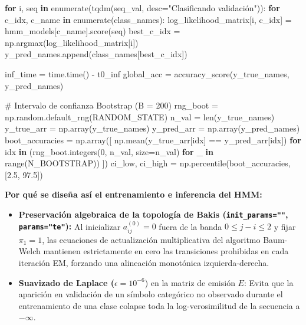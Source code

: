 \documentclass[
  spanish,
  us-letterpaper,
]{scrreprt}
\newenvironment{Shaded}{\begin{snugshade}}{\end{snugshade}}
\newcommand{\BuiltInTok}[1]{\textcolor[rgb]{0.00,0.23,0.31}{#1}}
\newcommand{\CommentTok}[1]{\textcolor[rgb]{0.37,0.37,0.37}{#1}}
\newcommand{\ControlFlowTok}[1]{\textcolor[rgb]{0.00,0.23,0.31}{\textbf{#1}}}
\newcommand{\DecValTok}[1]{\textcolor[rgb]{0.68,0.00,0.00}{#1}}
\newcommand{\FloatTok}[1]{\textcolor[rgb]{0.68,0.00,0.00}{#1}}
\newcommand{\KeywordTok}[1]{\textcolor[rgb]{0.00,0.23,0.31}{\textbf{#1}}}
\newcommand{\NormalTok}[1]{\textcolor[rgb]{0.00,0.23,0.31}{#1}}
\newcommand{\OperatorTok}[1]{\textcolor[rgb]{0.37,0.37,0.37}{#1}}
\newcommand{\StringTok}[1]{\textcolor[rgb]{0.13,0.47,0.30}{#1}}
\providecommand{\tightlist}{%
  \setlength{\itemsep}{0pt}\setlength{\parskip}{0pt}}
\theoremstyle{definition}
\theoremstyle{remark}
\begin{document}
\begin{Shaded}
\begin{Highlighting}[]
\ControlFlowTok{for}\NormalTok{ i, seq }\KeywordTok{in} \BuiltInTok{enumerate}\NormalTok{(tqdm(seq\_val, desc}\OperatorTok{=}\StringTok{"Clasificando validación"}\NormalTok{)):}
    \ControlFlowTok{for}\NormalTok{ c\_idx, c\_name }\KeywordTok{in} \BuiltInTok{enumerate}\NormalTok{(class\_names):}
\NormalTok{        log\_likelihood\_matrix[i, c\_idx] }\OperatorTok{=}\NormalTok{ hmm\_models[c\_name].score(seq)}
\NormalTok{    best\_c\_idx }\OperatorTok{=}\NormalTok{ np.argmax(log\_likelihood\_matrix[i])}
\NormalTok{    y\_pred\_names.append(class\_names[best\_c\_idx])}

\NormalTok{inf\_time }\OperatorTok{=}\NormalTok{ time.time() }\OperatorTok{{-}}\NormalTok{ t0\_inf}
\NormalTok{global\_acc }\OperatorTok{=}\NormalTok{ accuracy\_score(y\_true\_names, y\_pred\_names)}

\CommentTok{\# Intervalo de confianza Bootstrap (B = 200)}
\NormalTok{rng\_boot }\OperatorTok{=}\NormalTok{ np.random.default\_rng(RANDOM\_STATE)}
\NormalTok{n\_val }\OperatorTok{=} \BuiltInTok{len}\NormalTok{(y\_true\_names)}
\NormalTok{y\_true\_arr }\OperatorTok{=}\NormalTok{ np.array(y\_true\_names)}
\NormalTok{y\_pred\_arr }\OperatorTok{=}\NormalTok{ np.array(y\_pred\_names)}
\NormalTok{boot\_accuracies }\OperatorTok{=}\NormalTok{ np.array([}
\NormalTok{    np.mean(y\_true\_arr[idx] }\OperatorTok{==}\NormalTok{ y\_pred\_arr[idx])}
    \ControlFlowTok{for}\NormalTok{ idx }\KeywordTok{in}\NormalTok{ (rng\_boot.integers(}\DecValTok{0}\NormalTok{, n\_val, size}\OperatorTok{=}\NormalTok{n\_val) }\ControlFlowTok{for}\NormalTok{ \_ }\KeywordTok{in} \BuiltInTok{range}\NormalTok{(N\_BOOTSTRAP))}
\NormalTok{])}
\NormalTok{ci\_low, ci\_high }\OperatorTok{=}\NormalTok{ np.percentile(boot\_accuracies, [}\FloatTok{2.5}\NormalTok{, }\FloatTok{97.5}\NormalTok{])}
\end{Highlighting}
\end{Shaded}

\textbf{Por qué se diseña así el entrenamiento e inferencia del HMM:}

\begin{itemize}
\tightlist
\item
  \textbf{Preservación algebraica de la topología de Bakis
  (\texttt{init\_params=""}, \texttt{params="te"}):} Al inicializar
  \(a_{ij}^{(0)} = 0\) fuera de la banda \(0 \le j - i \le 2\) y fijar
  \(\pi_1 = 1\), las ecuaciones de actualización multiplicativa del
  algoritmo Baum-Welch mantienen estrictamente en cero las transiciones
  prohibidas en cada iteración EM, forzando una alineación monotónica
  izquierda-derecha.
\item
  \textbf{Suavizado de Laplace (}\(\epsilon = 10^{-6}\)) en la matriz de
  emisión \(E\): Evita que la aparición en validación de un símbolo
  categórico no observado durante el entrenamiento de una clase colapse
  toda la log-verosimilitud de la secuencia a \(-\infty\).
\end{itemize}
\end{document}
